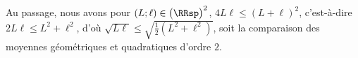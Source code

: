 \begin{remark}
	Au passage, nous avons pour $(L ; \ell) \in \big( \RRsp \big)^2$, $4 L \ell \leq (L + \ell)^2$, c'est-à-dire $2 L \ell \leq L^2 + \ell^2$, d'où $\sqrt{L \ell} \leq \sqrt{\frac12 (L^2 + \ell^2)}$, soit la comparaison des moyennes géométriques et quadratiques d'ordre $2$.
\end{remark}
